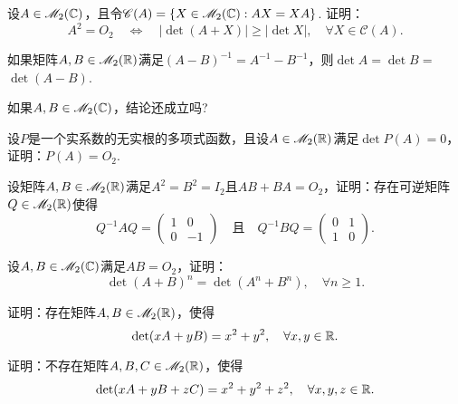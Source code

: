 \begin{mybox}
  \begin{problem}[幂零矩阵的中心化子.]

    设$A\in\mathscr M_2(\mathbb C)$，且令$\mathscr C(A)=\{X\in\mathscr M_2(\mathbb C):AX=XA\}$. 证明：
    \[
      A^2 = O_2 \quad \Leftrightarrow\quad
      |\det(A+X)| \ge |\det X|,\quad \forall X\in\mathscr C(A).
    \]
  \end{problem}
\end{mybox}

\begin{mybox}
  \begin{problem}
    \begin{enumerate*}[label=(\alph*),listparindent=2em,itemjoin=\\]
      \item 如果矩阵$A,B\in\mathscr M_2(\mathbb R)$满足$(A-B)^{-1}=A^{-1}-B^{-1}$，则$\det A=\det B=$ $\det(A-B)$.
      \item 如果$A,B\in\mathscr M_2(\mathbb C)$，结论还成立吗?
    \end{enumerate*}
  \end{problem}
\end{mybox}

\begin{mybox}
  \begin{problem}
    设$P$是一个实系数的无实根的多项式函数，且设$A\in\mathscr M_2(\mathbb R)$满足$\det P(A)=0$，证明：$P(A)=O_2$.
  \end{problem}
\end{mybox}

\begin{problem}
  \cite[p.145]{58} 设矩阵$A,B\in\mathscr M_2(\mathbb R)$满足$A^2=B^2=I_2$且$AB+BA=O_2$，证明：存在可逆矩阵$Q\in\mathscr M_2(\mathbb R)$使得
  \[
    Q^{-1}AQ = \begin{pmatrix}
      1 & 0 \\
      0 & -1
    \end{pmatrix}\quad \text{且}\quad
    Q^{-1}BQ = \begin{pmatrix}
      0 & 1 \\
      1 & 0
    \end{pmatrix}.
  \]
\end{problem}

\begin{problem}
  设$A,B\in\mathscr M_2(\mathbb C)$满足$AB=O_2$，证明：
  \[
    \det (A + B)^n = \det (A^n + B^n) ,\quad \forall n\ge1.
  \]
\end{problem}

\begin{problem}
  \begin{inparaenum}[(a)]
    \item 证明：存在矩阵$A,B\in\mathscr M_2(\mathbb R)$，使得
      \[
        \det (xA + yB) = x^2 + y^2,\quad \forall x,y\in\mathbb R.
      \]
    \item 证明：不存在矩阵$A,B,C\in\mathscr M_2(\mathbb R)$，使得
      \[
        \det (xA + yB + zC) = x^2 + y^2 + z^2,\quad\forall x,y,z\in\mathbb R.
      \]
  \end{inparaenum}
\end{problem}

